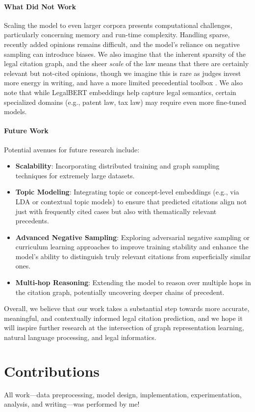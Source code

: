 \documentclass{article}
\begin{document}
\paragraph{What Did Not Work}
Scaling the model to even larger corpora presents computational challenges, particularly concerning memory and run-time complexity. Handling sparse, recently added opinions remains difficult, and the model’s reliance on negative sampling can introduce biases. We also imagine that the inherent sparsity of the legal citation graph, and the sheer \emph{scale} of the law means that there are certainly relevant but not-cited opinions, though we imagine this is rare as judges invest more energy in writing, and have a more limited precedential toolbox \citep{Drobak2008UnderstandingJD, Williams2016}.  We also note that while LegalBERT embeddings help capture legal semantics, certain specialized domains (e.g., patent law, tax law) may require even more fine-tuned models.

\paragraph{Future Work}
Potential avenues for future research include:
\begin{itemize}[leftmargin=*]
    \item \textbf{Scalability}: Incorporating distributed training and graph sampling techniques for extremely large datasets.
    \item \textbf{Topic Modeling}: Integrating topic or concept-level embeddings (e.g., via LDA or contextual topic models) to ensure that predicted citations align not just with frequently cited cases but also with thematically relevant precedents.
    \item \textbf{Advanced Negative Sampling}: Exploring adversarial negative sampling or curriculum learning approaches to improve training stability and enhance the model’s ability to distinguish truly relevant citations from superficially similar ones.
    \item \textbf{Multi-hop Reasoning}: Extending the model to reason over multiple hops in the citation graph, potentially uncovering deeper chains of precedent.
\end{itemize}

Overall, we believe that our work takes a substantial step towards more accurate, meaningful, and contextually informed legal citation prediction, and we hope it will inspire further research at the intersection of graph representation learning, natural language processing, and legal informatics.

\section*{Contributions}
All work—data preprocessing, model design, implementation, experimentation, analysis, and writing—was performed by me!

\medskip

\small



\end{document}
